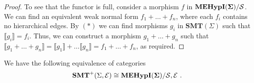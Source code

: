 \begin{proof}
To see that the functor is full,  consider a morphism $f$ in ${\mathbf{MEHypI(\Sigma)}} / \mathcal{S}$.  
We can find an equivalent weak normal form $f_1 + \ldots + f_n$,  where each $f_i$ contains no hierarchical edges.  
By $(*)$ we can find morphisms $g_i$ in $\textbf{SMT}(\Sigma)$ such that $\llbracket g_i \rrbracket = f_i$.  
Thus,  we can construct a morphism $g_1 + \ldots + g_n$ such that $\llbracket g_1 + \ldots + g_n \rrbracket = \llbracket g_1 \rrbracket + \ldots \llbracket g_n \rrbracket = f_1 + \ldots + f_n$,  as required. 
\end{proof}

\begin{theorem}
We have the following equivalence of categories
\[
	\textbf{SMT}^{+}(\Sigma, \mathcal {E} ) \cong {\mathbf{MEHypI(\Sigma)}} / \mathcal{S,E}~.
\]
\end{theorem}
